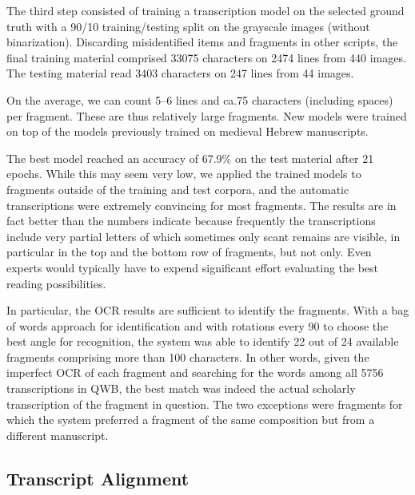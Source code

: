 The third step consisted of training a transcription model on the selected
ground truth with a 90/10 training/testing split on the grayscale images
(without binarization).  Discarding misidentified items and fragments in other
scripts, the final training material comprised 33075 characters on 2474 lines
from 440 images.  The testing material read 3403 characters on 247 lines from
44 images.

On the average, we can count 5--6 lines and ca.\@ 75 characters (including
spaces) per fragment.  These are thus relatively large fragments.
New models were trained on top of the models previously trained on medieval
Hebrew manuscripts.

The best model reached an accuracy of 67.9\%  on the test material after 21
epochs. 
While this may seem very low, we applied the trained models to fragments
outside of the training and test corpora, and the automatic transcriptions were
extremely convincing for most fragments.  The results are in fact better than
the numbers indicate because frequently the transcriptions include very partial
letters of which sometimes only scant remains are visible, in particular in the
top and the bottom row of fragments, but not only.  Even experts would
typically have to expend significant effort evaluating the best reading
possibilities.

In particular, the OCR results are sufficient to identify the fragments.  With
a bag of words approach for identification and with rotations every 90{\degree}
to choose the best angle for recognition, the system was able to identify 22
out of 24 available fragments comprising more than 100 characters. 
In other words, given the imperfect OCR of each fragment and searching for the
words among all 5756 transcriptions in QWB, the best match was indeed the
actual scholarly transcription of the fragment in question.  The two exceptions
were fragments for which the system preferred a fragment of the same
composition but from a different manuscript.

\subsection{Transcript Alignment}\label{sec:al}


